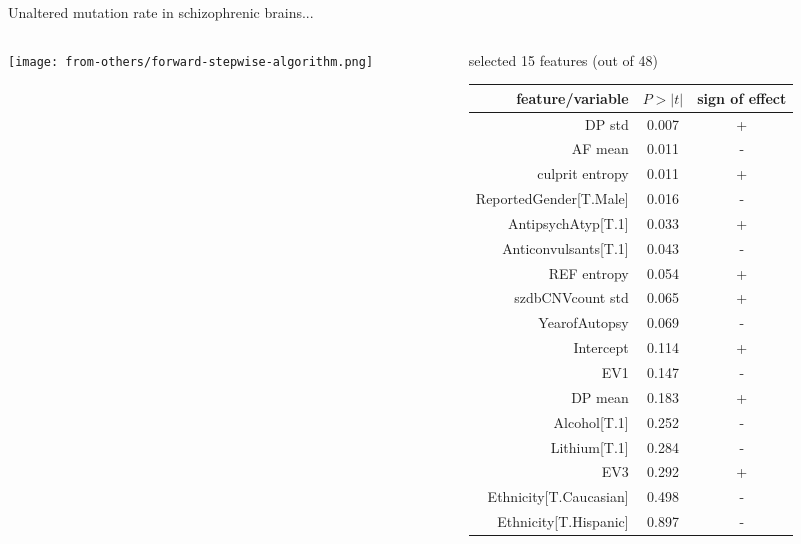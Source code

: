 \documentclass[usenames,dvipsnames]{beamer}
\begin{document}
\begin{frame}{Unaltered mutation rate in schizophrenic brains...}
\begin{columns}[t]
\begin{column}{0.5\textwidth}

\texttt{[image: from-others/forward-stepwise-algorithm.png]}
\end{column}

\begin{column}{0.5\textwidth}
\begin{center}
\small
selected 15 features (out of 48)
\end{center}
\tiny
\begin{tabular}{rcc}
	feature/variable & \(P>|t|\) & sign of effect \\
\hline
DP std & 0.007 & + \\
AF mean & 0.011 & - \\
culprit entropy & 0.011 & + \\
ReportedGender[T.Male] & 0.016 & - \\
AntipsychAtyp[T.1] & 0.033 & + \\
Anticonvulsants[T.1] & 0.043 & - \\
REF entropy & 0.054 & + \\
szdbCNVcount std & 0.065 & + \\
YearofAutopsy & 0.069 & - \\
Intercept & 0.114 & + \\
EV1 & 0.147 & - \\
DP mean & 0.183 & + \\
Alcohol[T.1] & 0.252 & - \\
Lithium[T.1] & 0.284 & - \\
EV3 & 0.292 & + \\
Ethnicity[T.Caucasian] & 0.498 & - \\
Ethnicity[T.Hispanic] & 0.897 & - \\
\end{tabular}
\end{column}
\end{columns}
\end{frame}
\end{document}
